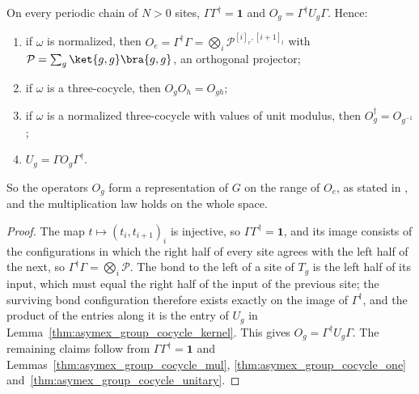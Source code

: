\begin{lemma}
    \label{lem:asymex_group_cocycle_boundary_operators}
    \leanok
    On every periodic chain of $N>0$ sites, $\Gamma\Gamma^\dagger=\mathbf 1$
    and $O_g=\Gamma^\dagger U_g\Gamma$. Hence:
    \begin{enumerate}
        \item if $\omega$ is normalized, then
              $O_e=\Gamma^\dagger\Gamma=\bigotimes_i\mathcal P^{[i]_r,[i+1]_l}$
              with $\mathcal P=\sum_g\ket{g,g}\bra{g,g}$, an orthogonal
              projector;
        \item if $\omega$ is a three-cocycle, then $O_gO_h=O_{gh}$;
        \item if $\omega$ is a normalized three-cocycle with values of unit
              modulus, then $O_g^\dagger=O_{g^{-1}}$;
        \item $U_g=\Gamma O_g\Gamma^\dagger$.
    \end{enumerate}
    So the operators $O_g$ form a representation of $G$ on the range of
    $O_e$, as stated in \cite{GarreRubio2023MPOSym}, and the multiplication
    law holds on the whole space.
\end{lemma}

\begin{proof}\leanok
    The map $t\mapsto(t_i,t_{i+1})_i$ is injective, so
    $\Gamma\Gamma^\dagger=\mathbf 1$, and its image consists of the
    configurations in which the right half of every site agrees with the
    left half of the next, so $\Gamma^\dagger\Gamma=\bigotimes_i\mathcal P$.
    The bond to the left of a site of $T_g$ is the left half of its input,
    which must equal the right half of the input of the previous site; the
    surviving bond configuration therefore exists exactly on the image of
    $\Gamma^\dagger$, and the product of the entries along it is the entry of
    $U_g$ in Lemma~\ref{thm:asymex_group_cocycle_kernel}. This gives
    $O_g=\Gamma^\dagger U_g\Gamma$. The remaining claims follow from
    $\Gamma\Gamma^\dagger=\mathbf 1$ and
    Lemmas~\ref{thm:asymex_group_cocycle_mul},
    \ref{thm:asymex_group_cocycle_one} and~\ref{thm:asymex_group_cocycle_unitary}.
\end{proof}

